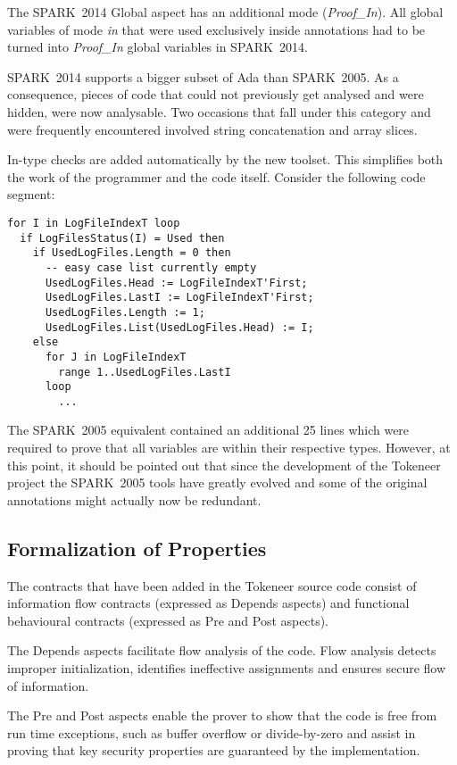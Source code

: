 \documentclass[10pt,a4paper,twocolumn]{article}
\newcommand{\oldspark}{SPARK~2005\xspace}
\newcommand{\newspark}{SPARK~2014\xspace}
\begin{document}
The \newspark Global aspect has an additional mode
(\emph{Proof\_In}). All global variables of mode \emph{in} that were
used exclusively inside annotations had to be turned into
\emph{Proof\_In} global variables in \newspark.

\newspark supports a bigger subset of Ada than \oldspark. As a
consequence, pieces of code that could not previously get analysed and
were hidden, were now analysable. Two occasions that fall under this
category and were frequently encountered involved string concatenation
and array slices.

In-type checks are added automatically by the new toolset. This
simplifies both the work of the programmer and the code
itself. Consider the following code segment:
\begin{lstlisting}[caption=\newspark]
for I in LogFileIndexT loop
  if LogFilesStatus(I) = Used then
    if UsedLogFiles.Length = 0 then
      -- easy case list currently empty
      UsedLogFiles.Head := LogFileIndexT'First;
      UsedLogFiles.LastI := LogFileIndexT'First;
      UsedLogFiles.Length := 1;
      UsedLogFiles.List(UsedLogFiles.Head) := I;
    else
      for J in LogFileIndexT
        range 1..UsedLogFiles.LastI
      loop
        ...
\end{lstlisting}
The \oldspark equivalent contained an additional 25 lines which were
required to prove that all variables are within their respective
types. However, at this point, it should be pointed out that since the
development of the Tokeneer project the \oldspark tools have greatly
evolved and some of the original annotations might actually now be
redundant.

\subsection{Formalization of Properties}

The contracts that have been added in the Tokeneer source code consist
of information flow contracts (expressed as Depends aspects) and
functional behavioural contracts (expressed as Pre and Post aspects).

The Depends aspects facilitate flow analysis of the code. Flow
analysis detects improper initialization, identifies ineffective
assignments and ensures secure flow of information.

The Pre and Post aspects enable the prover to show that the code is
free from run time exceptions, such as buffer overflow or
divide-by-zero and assist in proving that key security properties are
guaranteed by the implementation.
\end{document}
